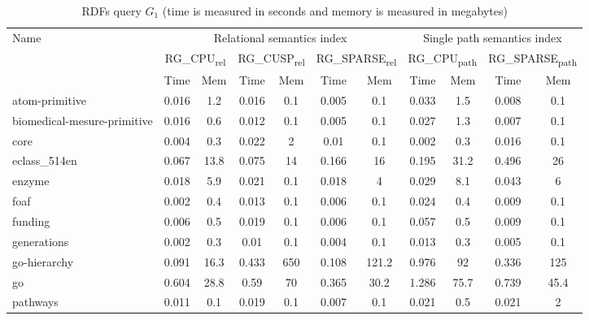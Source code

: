 {\setlength{\tabcolsep}{0.4em}
\begin{table}[h]
\caption{RDFs query $G_1$ (time is measured in seconds and memory is measured in megabytes)}
\label{tbl:tableRDFQ1}
\begin{tabular}{| l | c  c | c  c | c  c | c  c | c  c |}
    \hline

    \multirow{3}{*}{Name}   &   \multicolumn{6}{|c|}{Relational semantics index}	&	\multicolumn{4}{|c|}{Single path semantics index} \\
    \cline{2-11}
    	    &	\multicolumn{2}{|c|}{RG\_CPU\textsubscript{rel}}	&	\multicolumn{2}{|c|}{RG\_CUSP\textsubscript{rel}}	&	\multicolumn{2}{|c|}{RG\_SPARSE\textsubscript{rel}} &	\multicolumn{2}{|c|}{RG\_CPU\textsubscript{path}}	&	\multicolumn{2}{|c|}{RG\_SPARSE\textsubscript{path}}	 \\
    \cline{2-11}
            &   Time & Mem &  Time     & Mem & Time     & Mem  &  Time     & Mem & Time     & Mem \\
    \hline
    \hline
    atom-primitive              & 0.016 & 1.2  & 0.016 & 0.1 & 0.005 & 0.1  & 0.033 & 1.5  & 0.008 & 0.1  \\
biomedical-mesure-primitive & 0.016 & 0.6  & 0.012 & 0.1 & 0.005 & 0.1      & 0.027 & 1.3  & 0.007 & 0.1  \\
core                        & 0.004 & 0.3  & 0.022 & 2   & 0.01  & 0.1      & 0.002 & 0.3  & 0.016 & 0.1  \\
eclass\_514en                 & 0.067 & 13.8 & 0.075 & 14  & 0.166 & 16     & 0.195 & 31.2 & 0.496 & 26   \\
enzyme                      & 0.018 & 5.9  & 0.021 & 0.1 & 0.018 & 4        & 0.029 & 8.1  & 0.043 & 6    \\
foaf                        & 0.002 & 0.4  & 0.013 & 0.1 & 0.006 & 0.1      & 0.024 & 0.4  & 0.009 & 0.1  \\
funding                     & 0.006 & 0.5  & 0.019 & 0.1 & 0.006 & 0.1      & 0.057 & 0.5  & 0.009 & 0.1  \\
generations                 & 0.002 & 0.3  & 0.01  & 0.1 & 0.004 & 0.1      & 0.013 & 0.3  & 0.005 & 0.1  \\
go-hierarchy                & 0.091 & 16.3 & 0.433 & 650 & 0.108 & 121.2    & 0.976 & 92   & 0.336 & 125  \\
go                          & 0.604 & 28.8 & 0.59  & 70  & 0.365 & 30.2     & 1.286 & 75.7 & 0.739 & 45.4 \\
pathways                    & 0.011 & 0.1  & 0.019 & 0.1 & 0.007 & 0.1      & 0.021 & 0.5  & 0.021 & 2    \\

\end{tabular}
\end{table}}
